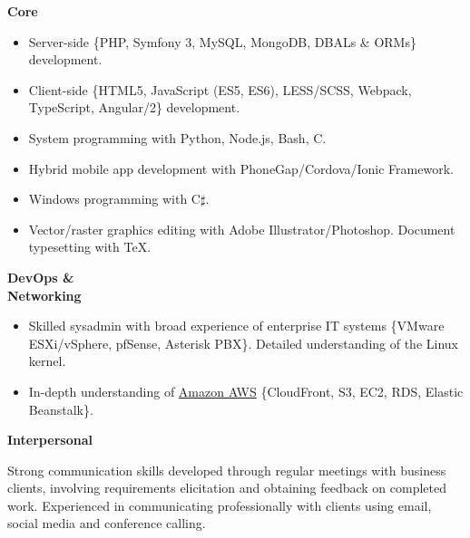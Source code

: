 
\begin{minipage}[t]{0.20\linewidth}
    \textbf{Core}
\end{minipage} 
\begin{minipage}[t]{0.80\linewidth}
    \begin{itemize}[leftmargin=*]
        \setlength\itemsep{0.05em}
        \item Server-side \big\{PHP, Symfony 3, MySQL, MongoDB, DBALs \& ORMs\big\} development.
        \item Client-side \big\{HTML5, JavaScript (ES5, ES6), LESS/SCSS, Webpack, TypeScript, Angular/2\big\} development.
        \item System programming with Python, Node.js, Bash, C.
        \item Hybrid mobile app development with PhoneGap/Cordova/Ionic Framework.
        \item Windows programming with C$\sharp$.
        \item Vector/raster graphics editing with Adobe Illustrator/Photoshop. Document typesetting with \TeX.
    \end{itemize}
\end{minipage}

\vspace{5mm}


\begin{minipage}[t]{0.20\linewidth}
    \textbf{DevOps \& \\Networking}
\end{minipage} 
\begin{minipage}[t]{0.80\linewidth}
    \begin{itemize}[leftmargin=*]
        \setlength\itemsep{0.05em}
        \item Skilled sysadmin with broad experience of enterprise IT systems \big\{VMware ESXi/vSphere, pfSense, Asterisk PBX\big\}. Detailed understanding of the Linux kernel.
        \item In-depth understanding of \href{https://aws.amazon.com/}{Amazon AWS} \big\{CloudFront, S3, EC2, RDS, Elastic Beanstalk\big\}.
    \end{itemize}
\end{minipage}

\vspace{5mm}


\begin{minipage}[t]{0.20\linewidth}
    \textbf{Interpersonal}
\end{minipage} 
\begin{minipage}[t]{0.80\linewidth}
    Strong communication skills developed through regular meetings with business clients, involving requirements elicitation and obtaining feedback on completed work. Experienced in communicating professionally with clients using email, social media and conference calling.
\end{minipage}